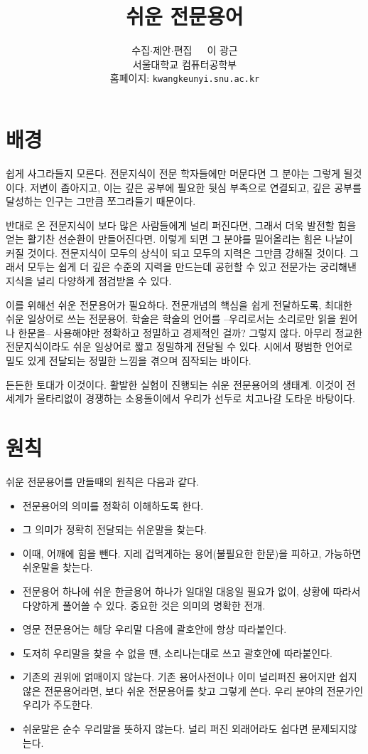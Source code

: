 \documentclass[11pt]{article}
\title{쉬운 전문용어}
\author{수집\(\cdot\)제안\(\cdot\)편집\ \ \  이 광근\\
  서울대학교 컴퓨터공학부\\
  홈페이지: \texttt{kwangkeunyi.snu.ac.kr}
}
\date{}
\begin{document}
\maketitle

\section*{배경}
쉽게 사그라들지 모른다. 전문지식이 전문 학자들에만 머문다면 그 분야는
그렇게 될것이다. 저변이 좁아지고, 이는 깊은 공부에 필요한 뒷심 부족으로
연결되고, 깊은 공부를 달성하는 인구는 그만큼 쪼그라들기 때문이다.

반대로 온 전문지식이 보다 많은 사람들에게 널리 퍼진다면, 그래서 더욱
발전할 힘을 얻는 활기찬 선순환이 만들어진다면. 이렇게 되면 그 분야를
밀어올리는 힘은 나날이 커질 것이다. 전문지식이 모두의 상식이 되고
모두의 지력은 그만큼 강해질 것이다. 그래서 모두는 쉽게 더 깊은 수준의
지력을 만드는데 공헌할 수 있고 전문가는 궁리해낸 지식을 널리 다양하게
점검받을 수 있다.

이를 위해선 쉬운 전문용어가 필요하다. 전문개념의 핵심을 쉽게 전달하도록,
최대한 쉬운 일상어로 쓰는 전문용어. 학술은 학술의 언어를
--우리로서는 소리로만 읽을 원어나 한문을-- 사용해야만 정확하고
정밀하고 경제적인 걸까? 그렇지 않다. 아무리 정교한 전문지식이라도 쉬운
일상어로 짧고 정밀하게 전달될 수 있다. 시에서 평범한 언어로 밀도 있게
전달되는 정밀한 느낌을 겪으며 짐작되는 바이다.

든든한 토대가 이것이다. 활발한 실험이 진행되는 쉬운 전문용어의
생태계. 이것이 전세계가 울타리없이 경쟁하는 소용돌이에서 우리가 선두로
치고나갈 도타운 바탕이다.

\section*{원칙}
쉬운 전문용어를 만들때의 원칙은 다음과 같다.
\begin{itemize}
\item 전문용어의 의미를 정확히 이해하도록 한다.
\item 그 의미가 정확히 전달되는 쉬운말을 찾는다.
\item 이때, 어깨에 힘을 뺀다. 지레 겁먹게하는 용어(불필요한 한문)을 피하고, 가능하면
  쉬운말을 찾는다. 
\item 전문용어 하나에 쉬운 한글용어 하나가 일대일 대응일 필요가 없이,
  상황에 따라서 다양하게 풀어쓸 수 있다. 중요한 것은 의미의 명확한
  전개.
\item 영문 전문용어는 해당 우리말 다음에 괄호안에 항상 따라붙인다.
\item 도저히 우리말을 찾을 수 없을 땐, 소리나는대로 쓰고 괄호안에
  따라붙인다. 
\item 기존의 권위에 얽매이지 않는다. 기존 용어사전이나 이미 널리퍼진
  용어지만 쉽지않은 전문용어라면, 보다 쉬운 전문용어를 찾고 그렇게
  쓴다. 우리 분야의 전문가인 우리가 주도한다.
\item 쉬운말은 순수 우리말을 뜻하지 않는다. 널리 퍼진 외래어라도
  쉽다면 문제되지않는다.
\end{itemize}



\printindex
\end{document}

